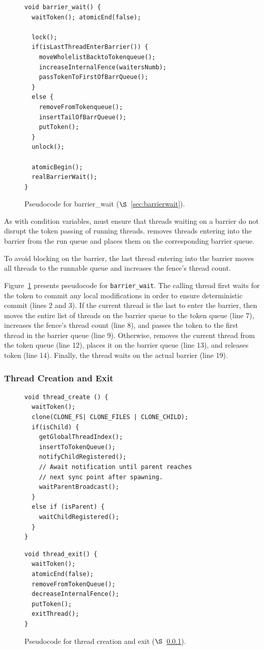 \label{sec:barrierwait}

\begin{figure}
\begin{lstlisting}
void barrier_wait() {
  waitToken(); atomicEnd(false);
 
  lock();
  if(isLastThreadEnterBarrier()) {
	moveWholelistBacktoTokenqueue();
	increaseInternalFence(waitersNumb);
	passTokenToFirstOfBarrQueue();
  } 
  else {
    removeFromTokenqueue();
	insertTailOfBarrQueue();
	putToken();
  }
  unlock();

  atomicBegin();
  realBarrierWait();  
}
\end{lstlisting}
\caption{Pseudocode for barrier\_wait ($\S$~\ref{sec:barrierwait}).
\label{fig:barrierwait}}
\end{figure}

As with condition variables, \dthreads{} must ensure that threads
waiting on a barrier do not disrupt the token passing of running
threads. \dthreads{} removes threads entering into the barrier from
the run queue and places them on the corresponding barrier queue.

To avoid blocking on the barrier, the last thread entering into
the barrier moves all threads to the runnable queue and increases
the fence's thread count.

Figure~\ref{fig:barrierwait} presents pseudocode
for \texttt{barrier\_wait}. The calling thread first waits for the
token to commit any local modifications in order to ensure
deterministic commit (lines 2 and 3). If the current thread is the
last to enter the barrier, then \dthreads{} moves the entire list of
threads on the barrier queue to the token queue (line 7), increases
the fence's thread count (line 8), and passes the token to the first thread in the
barrier queue (line 9).  Otherwise, \dthreads{} removes the current
thread from the token queue (line 12), places it on the barrier queue
(line 13), and releases token (line 14). Finally, the thread waits on
the actual barrier (line 19).

\subsubsection{Thread Creation and Exit}

\label{sec:threadcreation}

\begin{figure}
\begin{lstlisting}
void thread_create () {
  waitToken();
  clone(CLONE_FS| CLONE_FILES | CLONE_CHILD);
  if(isChild) {
    getGlobalThreadIndex();
	insertToTokenQueue();
	notifyChildRegistered();
	// Await notification until parent reaches 
    // next sync point after spawning.
	waitParentBroadcast();	
  }
  else if (isParent) {
	waitChildRegistered();
  }
}
\end{lstlisting}
\begin{lstlisting}
void thread_exit() {
  waitToken();
  atomicEnd(false);
  removeFromTokenQueue();
  decreaseInternalFence();
  putToken();
  exitThread(); 
}
\end{lstlisting}
\caption{Pseudocode for thread creation and exit ($\S$~\ref{sec:threadcreation}).
\label{fig:threadcreation}
}
\end{figure}

